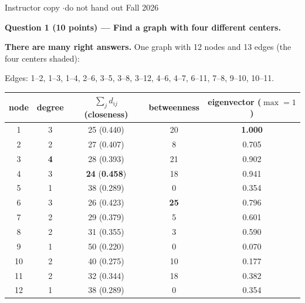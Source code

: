 \documentclass[a4paper, 11pt]{extarticle}
\renewcommand{\question}[3]{\vspace{0.3em}
  {\large\bfseries Question #1 \quad\normalsize\mdseries (#2 points) --- #3}\par
  \vspace{-0.3em}{\color{rulegrey}\rule{\textwidth}{0.6pt}}\par\vspace{0.1em}}
\newcommand{\ans}[1]{{\color{pltblue}\bfseries #1}}
\begin{document}
        {Instructor copy \quad$\cdot$\quad do not hand out}
        {Fall 2026}

\question{1}{10}{Find a graph with four different centers.}

\textbf{There are many right answers.} One graph with 12 nodes and 13 edges
(the four centers shaded):

\begin{center}
\end{center}

\vspace{-0.4em}
Edges: 1--2, 1--3, 1--4, 2--6, 3--5, 3--8, 3--12, 4--6, 4--7, 6--11, 7--8,
9--10, 10--11.

\begin{center}
\small
\renewcommand{\arraystretch}{1.15}
\begin{tabular}{|c|c|c|c|c|}
\hline
node & degree & $\sum_j d_{ij}$ (closeness) & betweenness & eigenvector ($\max = 1$) \\
\hline
1  & 3 & 25 (0.440) & 20 & \ans{1.000} \\ \hline
2  & 2 & 27 (0.407) &  8 & 0.705 \\ \hline
3  & \ans{4} & 28 (0.393) & 21 & 0.902 \\ \hline
4  & 3 & \ans{24} (\ans{0.458}) & 18 & 0.941 \\ \hline
5  & 1 & 38 (0.289) &  0 & 0.354 \\ \hline
6  & 3 & 26 (0.423) & \ans{25} & 0.796 \\ \hline
7  & 2 & 29 (0.379) &  5 & 0.601 \\ \hline
8  & 2 & 31 (0.355) &  3 & 0.590 \\ \hline
9  & 1 & 50 (0.220) &  0 & 0.070 \\ \hline
10 & 2 & 40 (0.275) & 10 & 0.177 \\ \hline
11 & 2 & 32 (0.344) & 18 & 0.382 \\ \hline
12 & 1 & 38 (0.289) &  0 & 0.354 \\ \hline
\end{tabular}
\end{center}
\end{document}
